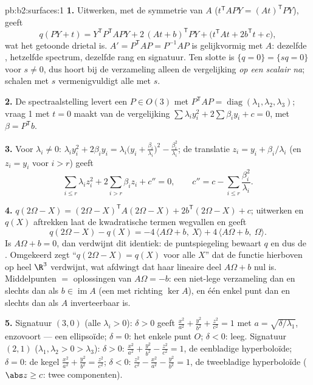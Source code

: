 \begin{solution}{pb:b2:surfaces:1}
\textbf{1.} Uitwerken, met de symmetrie van $A$ ($t^{\mathsf
T}\!APY = (At)^{\mathsf T}PY$), geeft
\[
q(PY + t) = Y^{\mathsf T}P^{\mathsf T}\!APY +
2\,(At + b)^{\mathsf T}PY + \bigl(t^{\mathsf T}\!At +
2b^{\mathsf T}t + c\bigr),
\]
wat het getoonde drietal is. $A' = P^{\mathsf T}\!AP = P^{-1}AP$ is
gelijkvormig met $A$: dezelfde , hetzelfde
spectrum, dezelfde rang en signatuur. Ten slotte is $\{q = 0\} =
\{sq = 0\}$ voor $s \neq 0$, dus hoort bij de verzameling alleen de
vergelijking \emph{op een scalair na}; schalen met $s$
vermenigvuldigt alle  met $s$.

\textbf{2.} De spectraalstelling levert een $P \in O(3)$ met
$P^{\mathsf T}\!AP = \operatorname{diag}(\lambda_1, \lambda_2,
\lambda_3)$; vraag 1 met $t = 0$ maakt van de vergelijking
$\sum\lambda_iy_i^2 + 2\sum\beta_iy_i + c = 0$, met $\beta =
P^{\mathsf T}b$.

\textbf{3.} Voor $\lambda_i \neq 0$: $\lambda_iy_i^2 +
2\beta_iy_i = \lambda_i\bigl(y_i +
\frac{\beta_i}{\lambda_i}\bigr)^2 - \frac{\beta_i^2}{\lambda_i}$;
de translatie $z_i = y_i + \beta_i/\lambda_i$ (en $z_i = y_i$ voor
$i > r$) geeft
\[
\sum_{i \leq r}\lambda_iz_i^2 + 2\sum_{i > r}\beta_iz_i +
c'' = 0, \qquad
c'' = c - \sum_{i\leq r}\frac{\beta_i^2}{\lambda_i}.
\]

\textbf{4.} $q(2\Omega - X) = (2\Omega - X)^{\mathsf T} A(2\Omega -
X) + 2b^{\mathsf T}(2\Omega - X) + c$; uitwerken en $q(X)$
aftrekken laat de kwadratische termen wegvallen en geeft
\[
q(2\Omega - X) - q(X) = -4\,\langle A\Omega + b,\ X\rangle +
4\,\langle A\Omega + b,\ \Omega\rangle .
\]
Is $A\Omega + b = 0$, dan verdwijnt dit identiek: de puntspiegeling
bewaart $q$ en dus de . Omgekeerd zegt ``$q(2\Omega - X) =
q(X)$ voor alle $X$'' dat de  functie hierboven op heel
$\R^3$ verdwijnt, wat afdwingt dat haar lineaire deel $A\Omega + b$
nul is. Middelpunten $=$ oplossingen van $A\Omega = -b$: een
niet-lege verzameling dan en slechts dan als $b \in
\operatorname{im}A$ (een  met richting $\ker A$),
en één enkel punt dan en slechts dan als $A$ inverteerbaar is.

\textbf{5.} Signatuur $(3,0)$ (alle $\lambda_i > 0$): $\delta > 0$
geeft $\frac{x^2}{a^2} + \frac{y^2}{b^2} + \frac{z^2}{c^2} = 1$ met
$a = \sqrt{\delta/\lambda_1}$, enzovoort --- een ellipsoïde;
$\delta = 0$: het enkele punt $O$; $\delta < 0$: leeg. Signatuur
$(2,1)$ ($\lambda_1, \lambda_2 > 0 > \lambda_3$): $\delta > 0$:
$\frac{x^2}{a^2} + \frac{y^2}{b^2} - \frac{z^2}{c^2} = 1$, de
eenbladige hyperboloïde; $\delta = 0$: de kegel $\frac{x^2}{a^2} +
\frac{y^2}{b^2} = \frac{z^2}{c^2}$; $\delta < 0$:
$\frac{z^2}{c^2} - \frac{x^2}{a^2} - \frac{y^2}{b^2} = 1$, de
tweebladige hyperboloïde ($\abs z \geq c$: twee componenten).


\end{solution}
